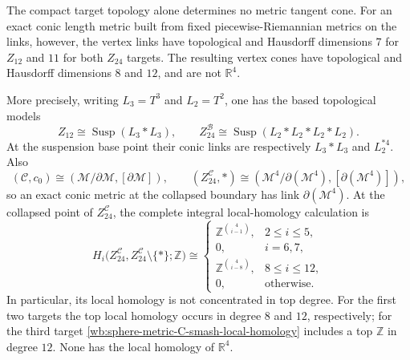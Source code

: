 \begin{proposition}
\label{wb:sphere-metric-tangent-scope}

The compact target topology alone determines no metric tangent cone.
For an exact conic length metric built from fixed piecewise-Riemannian
metrics on the links, however, the vertex links have topological and
Hausdorff dimensions \(7\) for \(Z_{12}\) and \(11\) for both
\(Z_{24}\) targets.  The resulting vertex cones have topological and
Hausdorff dimensions \(8\) and \(12\), and are not \(\mathbb R^4\).

More precisely, writing \(L_3=T^3\) and \(L_2=T^2\), one has the based
topological models
\[
 Z_{12}\cong\operatorname{Susp}(L_3*L_3),
 \qquad
 Z_{24}^{\mathcal B}
 \cong\operatorname{Susp}(L_2*L_2*L_2*L_2).
\]
At the suspension base point their conic links are respectively
\(L_3*L_3\) and \(L_2^{*4}\).  Also
\[
 (\mathcal C,c_0)
 \cong
 (\mathcal M/\partial\mathcal M,[\partial\mathcal M]),
 \qquad
 (Z_{24}^{\mathcal C},*)
 \cong
 (\mathcal M^4/\partial(\mathcal M^4),
  [\partial(\mathcal M^4)]),
\]
so an exact conic metric at the collapsed boundary has link
\(\partial(\mathcal M^4)\).  At the collapsed point of
\(Z_{24}^{\mathcal C}\), the complete integral local-homology calculation is
\begin{equation}
 H_i\bigl(Z_{24}^{\mathcal C},
          Z_{24}^{\mathcal C}\setminus\{*\};\mathbb Z\bigr)
 \cong
 \begin{cases}
  \mathbb Z^{\binom4{i-1}},&2\leq i\leq5,\\
  0,&i=6,7,\\
  \mathbb Z^{\binom4{i-8}},&8\leq i\leq12,\\
  0,&\text{otherwise}.
 \end{cases}
 \label{wb:sphere-metric-C-smash-local-homology}
\end{equation}
In particular, its local homology is not concentrated in top degree.  For
the first two targets the top local homology occurs in degree \(8\) and
\(12\), respectively; for the third target
\eqref{wb:sphere-metric-C-smash-local-homology} includes a top
\(\mathbb Z\) in degree \(12\).  None has the local homology of
\(\mathbb R^4\).


\end{proposition}
